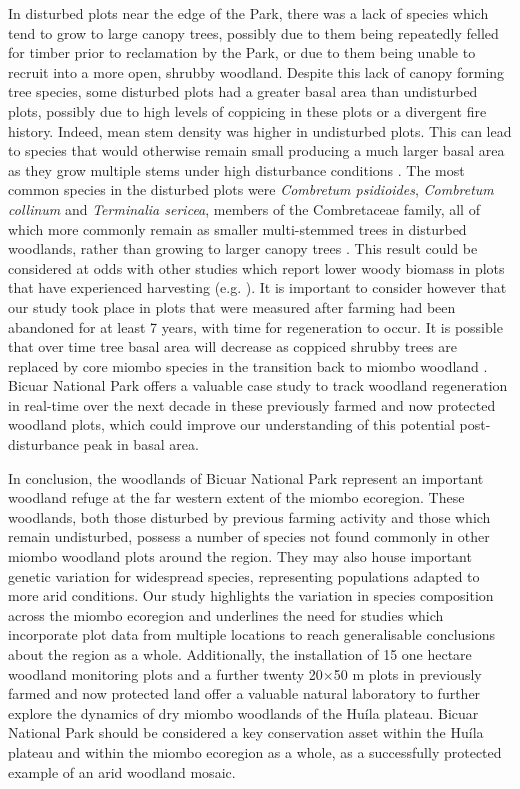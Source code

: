 \documentclass[diversity,article,submit,moreauthors,pdftex]{Definitions/mdpi}
\begin{document}
In disturbed plots near the edge of the Park, there was a lack of species which tend to grow to large canopy trees, possibly due to them being repeatedly felled for timber prior to reclamation by the Park, or due to them being unable to recruit into a more open, shrubby woodland. Despite this lack of canopy forming tree species, some disturbed plots had a greater basal area than undisturbed plots, possibly due to high levels of coppicing in these plots or a divergent fire history. Indeed, mean stem density was higher in undisturbed plots. This can lead to species that would otherwise remain small producing a much larger basal area as they grow multiple stems under high disturbance conditions \citep{Luoga2004}. The most common species in the disturbed plots were \textit{Combretum psidioides}, \textit{Combretum collinum} and \textit{Terminalia sericea}, members of the Combretaceae family, all of which more commonly remain as smaller multi-stemmed trees in disturbed woodlands, rather than growing to larger canopy trees \citep{Wyk2014}. This result could be considered at odds with other studies which report lower woody biomass in plots that have experienced harvesting (e.g. \citealt{Muvengwi2020}). It is important to consider however that our study took place in plots that were measured after farming had been abandoned for at least 7 years, with time for regeneration to occur. It is possible that over time tree basal area will decrease as coppiced shrubby trees are replaced by core miombo species in the transition back to miombo woodland \citep{Goncalves2017}.  Bicuar National Park offers a valuable case study to track woodland regeneration in real-time over the next decade in these previously farmed and now protected woodland plots, which could improve our understanding of this potential post-disturbance peak in basal area.

In conclusion, the woodlands of Bicuar National Park represent an important woodland refuge at the far western extent of the miombo ecoregion. These woodlands, both those disturbed by previous farming activity and those which remain undisturbed, possess a number of species not found commonly in other miombo woodland plots around the region. They may also house important genetic variation for widespread species, representing populations adapted to more arid conditions. Our study highlights the variation in species composition across the miombo ecoregion and underlines the need for studies which incorporate plot data from multiple locations to reach generalisable conclusions about the region as a whole. Additionally, the installation of 15 one hectare woodland monitoring plots and a further twenty 20$\times$50 m plots in previously farmed and now protected land offer a valuable natural laboratory to further explore the dynamics of dry miombo woodlands of the Hu\'{i}la plateau. Bicuar National Park should be considered a key conservation asset within the Hu\'{i}la plateau and within the miombo ecoregion as a whole, as a successfully protected example of an arid woodland mosaic.
\end{document}
